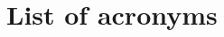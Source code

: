 \documentclass{report}
\theoremstyle{definition}
\theoremstyle{remark}
\begin{document}






\printindex

\newpage
\chapter*{List of acronyms}



\newpage


\end{document}

